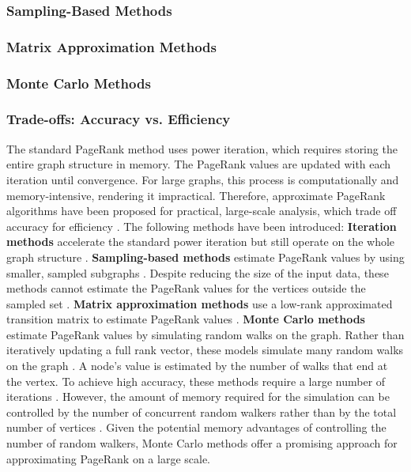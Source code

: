 \subsubsection{Sampling-Based Methods}
\subsubsection{Matrix Approximation Methods}
\subsubsection{Monte Carlo Methods}
\subsubsection{Trade-offs: Accuracy vs. Efficiency}

The standard PageRank method uses power iteration, which requires storing the entire graph structure in memory. The PageRank values are updated with each iteration until convergence. For large graphs, this process is computationally and memory-intensive, rendering it impractical. Therefore, approximate PageRank algorithms have been proposed for practical, large-scale analysis, which trade off accuracy for efficiency \cite{wu_efficient_2024}. The following methods have been introduced:
\textbf{Iteration methods} \cite{xie_parameterized_2023-1}\cite{anikin_efficient_2022} accelerate the standard power iteration but still operate on the whole graph structure \cite{wu_efficient_2024}. 
\textbf{Sampling-based methods} estimate PageRank values by using smaller, sampled subgraphs \cite{bar-yossef_local_2008}\cite{chen_local_2004}. Despite reducing the size of the input data, these methods cannot estimate the PageRank values for the vertices outside the sampled set \cite{wu_efficient_2024}.
\textbf{Matrix approximation methods} use a low-rank approximated transition matrix to estimate PageRank values \cite{liu_fast_2015}\cite{benczur_feasibility_2005}. 
\textbf{Monte Carlo methods} estimate PageRank values by simulating random walks on the graph. Rather than iteratively updating a full rank vector, these models simulate many random walks on the graph \cite{avrachenkov_monte_2007}. A node's value is estimated by the number of walks that end at the vertex. To achieve high accuracy, these methods require a large number of iterations \cite{wu_efficient_2024}. However, the amount of memory required for the simulation can be controlled by the number of concurrent random walkers rather than by the total number of vertices \cite{avrachenkov_monte_2007}. Given the potential memory advantages of controlling the number of random walkers, Monte Carlo methods offer a promising approach for approximating PageRank on a large scale.